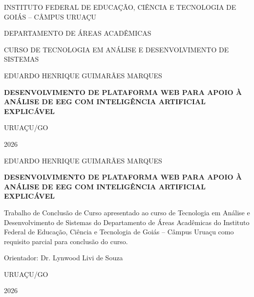 \begin{capa}
{\linespread{1.15}\selectfont
\begin{center}
INSTITUTO FEDERAL DE EDUCAÇÃO, CIÊNCIA E TECNOLOGIA DE GOIÁS -- CÂMPUS URUAÇU\par
DEPARTAMENTO DE ÁREAS ACADÊMICAS\par
CURSO DE TECNOLOGIA EM ANÁLISE E DESENVOLVIMENTO DE SISTEMAS\par
\vspace*{110pt}
EDUARDO HENRIQUE GUIMARÃES MARQUES\par
\vspace*{130pt}
\textbf{DESENVOLVIMENTO DE PLATAFORMA WEB PARA APOIO À ANÁLISE DE EEG COM INTELIGÊNCIA ARTIFICIAL EXPLICÁVEL}\par
\vfill
URUAÇU/GO\par
2026\par
\end{center}
}
\end{capa}

\begin{folhaderosto}
{\linespread{1.15}\selectfont
\begin{center}
EDUARDO HENRIQUE GUIMARÃES MARQUES\par
\vspace*{120pt}
\textbf{DESENVOLVIMENTO DE PLATAFORMA WEB PARA APOIO À ANÁLISE DE EEG COM INTELIGÊNCIA ARTIFICIAL EXPLICÁVEL}\par
\vspace*{90pt}
\hspace*{8.5cm}\begin{minipage}{7.2cm}
\fontsize{10}{12}\selectfont
\begin{SingleSpace}
Trabalho de Conclusão de Curso apresentado ao curso de Tecnologia em Análise e Desenvolvimento de Sistemas do Departamento de Áreas Acadêmicas do Instituto Federal de Educação, Ciência e Tecnologia de Goiás -- Câmpus Uruaçu como requisito parcial para conclusão do curso.

\vspace{0.8cm}
Orientador: Dr. Lynwood Livi de Souza
\end{SingleSpace}
\end{minipage}
\par\vfill
URUAÇU/GO\par
2026\par
\end{center}
}
\end{folhaderosto}

